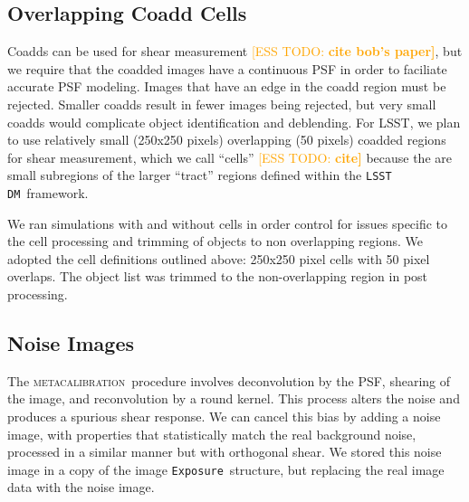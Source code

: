 \documentclass[twocolumn,twocolappendix,astrosym]{openjournal}
\newcommand{\esstodo}[1]{\textcolor{orange}{[ESS TODO: \bf #1]}}
\newcommand{\calexp}{\texttt{Exposure}}
\newcommand{\dm}{\texttt{LSST DM}}
\newcommand{\mcal}{\textsc{metacalibration}}
\begin{document}
\subsection{Overlapping Coadd Cells} \label{sec:sim:cells}

Coadds can be used for shear measurement \esstodo{cite bob's paper}, but we
require that the coadded images have a continuous PSF in order to faciliate
accurate PSF modeling.  Images that have an edge in the coadd region must be
rejected.  Smaller coadds result in fewer images being rejected, but very small
coadds would complicate object identification and deblending.  For LSST, we plan to
use relatively small (250x250 pixels) overlapping (50 pixels) coadded regions
for shear measurement, which we call ``cells'' \esstodo{cite} because the
are small subregions of the larger ``tract'' regions defined within the
\dm\ framework.

We ran simulations with and without cells in order control for issues specific
to the cell processing and trimming of objects to non overlapping regions.  We
adopted the cell definitions outlined above: 250x250 pixel cells with 50 pixel
overlaps. The object list was trimmed to the non-overlapping region in post
processing.

\subsection{Noise Images} \label{sec:sim:noiseimages}

The \mcal\ procedure involves deconvolution by the PSF, shearing of the image,
and reconvolution by a round kernel.  This process alters the noise and
produces a spurious shear response.  We can cancel this bias by adding a noise
image, with properties that statistically match the real background noise,
processed in a similar manner but with orthogonal shear.  We stored this
noise image in a copy of the image \calexp\ structure, but replacing the
real image data with the noise image.
\end{document}
